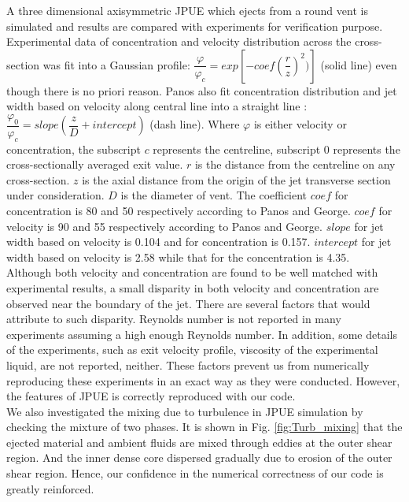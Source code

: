 \documentclass[journal abbreviation, manuscript]{copernicus}
\begin{document}
A three dimensional axisymmetric JPUE which ejects from a round vent is simulated and results are compared with experiments \citep {george1977turbulence, papanicolaou1988investigations} for verification purpose. Experimental data of concentration and velocity distribution across the cross-section was fit into a Gaussian profile: $\dfrac{\varphi}{\varphi_c}=exp[-coef (\dfrac{r}{z})^2)]$ (solid line) even though there is no priori reason. Panos \citep{papanicolaou1988investigations} also fit concentration distribution and jet width based on velocity along central line into a straight line : $\dfrac{\varphi_0}{\varphi_c}=slope (\dfrac{z}{D} + intercept)$ (dash line). Where $\varphi$ is either velocity or concentration, the subscript $c$ represents the centreline, subscript $0$ represents the cross-sectionally averaged exit value. $r$ is the distance from the centreline on any cross-section. $z$ is the axial distance from the origin of the jet transverse section under consideration. $D$ is the diameter of vent. 
The coefficient $coef$ for concentration is 80 and 50 respectively according to Panos and George. $coef$ for velocity is 90 and 55 respectively according to Panos and George. 
$slope$ for jet width based on velocity is 0.104 and for concentration is 0.157. $intercept$ for jet width based on velocity is 2.58 while that for the concentration is 4.35.\\
Although both velocity and concentration are found to be well matched with experimental results, a small disparity in both velocity and concentration are observed near the boundary of the jet. There are several factors that would attribute to such disparity. Reynolds number is not reported in many experiments assuming a high enough Reynolds number. In addition, some details of the experiments, such as exit velocity profile, viscosity of the experimental liquid, are not reported, neither. These factors prevent us from numerically reproducing these experiments in an exact way as they were conducted. However, the features of JPUE is correctly reproduced with our code.\\
We also investigated the mixing due to turbulence in JPUE simulation by checking the mixture of two phases. It is shown in Fig. \ref{fig:Turb_mixing} that the ejected material and ambient fluids are mixed through eddies at the outer shear region. And the inner dense core dispersed gradually due to erosion of the outer shear region. Hence, our confidence in the numerical correctness of our code  is greatly reinforced.
\end{document}
